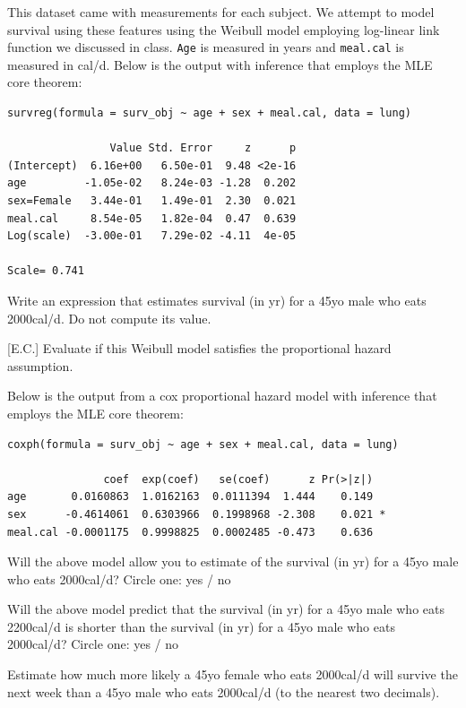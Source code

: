 \documentclass[12pt]{article}
\begin{document}
\noindent This dataset came with measurements for each subject. We attempt to model survival using these features using the Weibull model employing log-linear link function we discussed in class. \texttt{Age} is measured in years and \texttt{meal.cal} is measured in cal/d. Below is the output with inference that employs the MLE core theorem:

\begin{Verbatim}
survreg(formula = surv_obj ~ age + sex + meal.cal, data = lung)

                Value Std. Error     z      p
(Intercept)  6.16e+00   6.50e-01  9.48 <2e-16
age         -1.05e-02   8.24e-03 -1.28  0.202
sex=Female   3.44e-01   1.49e-01  2.30  0.021
meal.cal     8.54e-05   1.82e-04  0.47  0.639
Log(scale)  -3.00e-01   7.29e-02 -4.11  4e-05

Scale= 0.741 
\end{Verbatim}


\begin{enumerate}

 Write an expression that estimates survival (in yr) for a 45yo male who eats 2000cal/d. Do not compute its value. 

 [E.C.] Evaluate if this Weibull model satisfies the proportional hazard assumption.



Below is the output from a cox proportional hazard model with inference that employs the MLE core theorem:

\begin{Verbatim}
coxph(formula = surv_obj ~ age + sex + meal.cal, data = lung)

               coef  exp(coef)   se(coef)      z Pr(>|z|)  
age       0.0160863  1.0162163  0.0111394  1.444    0.149  
sex      -0.4614061  0.6303966  0.1998968 -2.308    0.021 *
meal.cal -0.0001175  0.9998825  0.0002485 -0.473    0.636 
\end{Verbatim}


 Will the above model allow you to estimate of the survival (in yr) for a 45yo male who eats 2000cal/d? Circle one: yes / no  

 Will the above model predict that the survival (in yr) for a 45yo male who eats 2200cal/d is shorter than the survival (in yr) for a 45yo male who eats 2000cal/d? Circle one: yes / no  


 Estimate how much more likely a 45yo female who eats 2000cal/d will survive the next week than a 45yo male who eats 2000cal/d (to the nearest two decimals). 
\end{enumerate}
\end{document}

